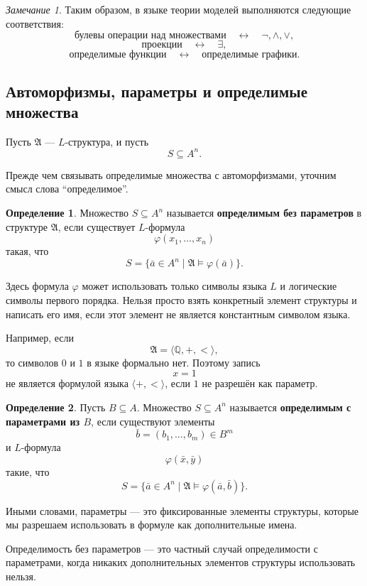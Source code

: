 \documentclass[12pt,a4paper,oneside,openany]{book}
\theoremstyle{definition}
\newtheorem{definition}{Определение}[chapter]
\theoremstyle{plain}
\theoremstyle{remark}
\newtheorem{remark}{Замечание}[chapter]
\begin{document}
\begin{remark}
Таким образом, в языке теории моделей выполняются следующие соответствия:
\[
\text{булевы операции над множествами}
\quad\longleftrightarrow\quad
\neg,\wedge,\vee,
\]
\[
\text{проекции}
\quad\longleftrightarrow\quad
\exists,
\]
\[
\text{определимые функции}
\quad\longleftrightarrow\quad
\text{определимые графики}.
\]
\end{remark}

\subsection{Автоморфизмы, параметры и определимые множества}

Пусть $\mathfrak A$ — $L$-структура, и пусть
\[
S\subseteq A^n.
\]

Прежде чем связывать определимые множества с автоморфизмами, уточним смысл слова ``определимое''.

\begin{definition}
Множество $S\subseteq A^n$ называется \textbf{определимым без параметров} в структуре $\mathfrak A$, если существует $L$-формула
\[
\varphi(x_1,\ldots,x_n)
\]
такая, что
\[
S=
\{\bar a\in A^n\mid \mathfrak A\models\varphi(\bar a)\}.
\]
\end{definition}

Здесь формула $\varphi$ может использовать только символы языка $L$ и логические символы первого порядка. Нельзя просто взять конкретный элемент структуры и написать его имя, если этот элемент не является константным символом языка.

Например, если
\[
\mathfrak A=\langle\mathbb Q,+,<\rangle,
\]
то символов $0$ и $1$ в языке формально нет. Поэтому запись
\[
x=1
\]
не является формулой языка $\langle +,<\rangle$, если $1$ не разрешён как параметр.

\begin{definition}
Пусть $B\subseteq A$. Множество $S\subseteq A^n$ называется \textbf{определимым с параметрами из $B$}, если существуют элементы
\[
\bar b=(b_1,\ldots,b_m)\in B^m
\]
и $L$-формула
\[
\varphi(\bar x,\bar y)
\]
такие, что
\[
S=
\{\bar a\in A^n\mid \mathfrak A\models\varphi(\bar a,\bar b)\}.
\]
\end{definition}

Иными словами, параметры — это фиксированные элементы структуры, которые мы разрешаем использовать в формуле как дополнительные имена.

Определимость без параметров — это частный случай определимости с параметрами, когда никаких дополнительных элементов структуры использовать нельзя.
\end{document}
